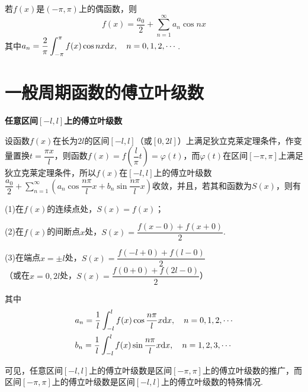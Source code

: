 若$f(x)$是$(-\pi,\pi)$上的偶函数，则
\begin{equation*}
    f(x)=\dfrac{a_0}{2}+\sum_{n=1}^\infty a_n\cos nx
\end{equation*}
其中$a_n=\displaystyle\dfrac{2}{\pi}\int_{-\pi}^\pi f(x)\cos nx\mathrm{d} x, \quad n=0,1,2,\cdots$.

\section{一般周期函数的傅立叶级数}
\textbf{任意区间$[-l,l]$上的傅立叶级数}

设函数$f(x)$在长为$2l$的区间$[-l,l]$（或$[0,2l]$）上满足狄立克莱定理条件，作变量置换$t=\dfrac{\pi x}{l}$，则函数$f(x)=f(\dfrac{l}{\pi}t)=\varphi(t)$，而$\varphi(t)$在区间$[-\pi,\pi]$上满足狄立克莱定理条件，所以$f(x)$在$[-l,l]$上的傅立叶级数$\dfrac{a_0}{2}+\displaystyle\sum_{n=1}^\infty(a_n\cos\dfrac{n\pi}{l}x+b_n\sin\dfrac{n\pi}{l}x)$收敛，并且，若其和函数为$S(x)$，则有

(1)在$f(x)$的连续点处，$S(x)=f(x)$；
\vspace{2mm}

(2)在$f(x)$的间断点$x$处，$S(x)=\dfrac{f(x-0)+f(x+0)}{2}$.
\vspace{2mm}

(3)在端点$x=\pm l$处，$S(x)=\dfrac{f(-l+0)+f(l-0)}{2}$\\\vspace{2mm}
（或在$x=0,2l$处，$S(x)=\dfrac{f(0+0)+f(2l-0)}{2}$）

其中
\begin{align*}
    & a_n=\dfrac{1}{l}\int_{-l}^l f(x)\cos\dfrac{n\pi}{l}x\mathrm{d} x, \quad n=0,1,2,\cdots \\
    & b_n=\dfrac{1}{l}\int_{-l}^l f(x)\sin\dfrac{n\pi}{l}x\mathrm{d} x, \quad n=1,2,3,\cdots
\end{align*}

可见，任意区间$[-l,l]$上的傅立叶级数是区间$[-\pi,\pi]$上的傅立叶级数的推广，而区间$[-\pi,\pi]$上的傅立叶级数是区间$[-l,l]$上的傅立叶级数的特殊情况.